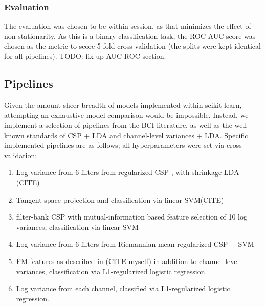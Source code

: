 \subsubsection{Evaluation}
The evaluation was chosen to be within-session, as that minimizes the effect of non-stationarity. As this is a binary classification task, the ROC-AUC score was chosen as the metric to score 5-fold cross validation (the splits were kept identical for all pipelines). 
TODO: fix up AUC-ROC section.
\subsection{Pipelines}

Given the amount sheer breadth of models implemented within scikit-learn,
attempting an exhaustive model comparison would be impossible. Instead, we
implement a selection of pipelines from the BCI literature, as well as the
well-known standards of CSP + LDA and channel-level variances + LDA. Specific
implemented pipelines are as follows; all hyperparameters were set via cross-validation:
\begin{enumerate}
  
\item Log variance from 6 filters from regularized CSP \cite{Lotte2011}, with shrinkage LDA (CITE)
\item Tangent space projection and classification via linear SVM(CITE)
\item filter-bank CSP with mutual-information based feature selection of 10 log variances, classification via linear SVM \cite{KaiKengAng2008}
\item Log variance from 6 filters from Riemannian-mean regularized CSP + SVM
\item FM features as described in (CITE myself) in addition to channel-level variances, classification via L1-regularized logistic regression. 
\item Log variance from each channel, classified via L1-regularized logistic regression.
\end{enumerate}

